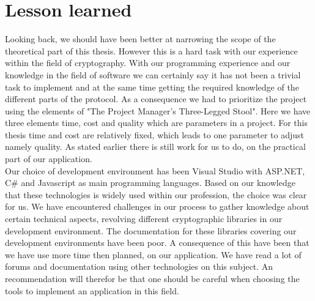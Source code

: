 \section{Lesson learned}
Looking back, we should have been better at narrowing the scope of the theoretical part of this thesis.  However this is a hard task with our  experience within the field of cryptography. With our programming experience and our knowledge in the field of software we can certainly say it has not been a trivial task to implement and at the same time getting the required knowledge of the different parts of the protocol. As a consequence we had to prioritize the project using the elements of "The Project Manager's Three-Legged Stool". Here we have three elements time, cost and quality which are parameters in a project. For this thesis time and cost are relatively fixed, which leads to one parameter to adjust namely quality. As stated earlier there is still work for us to do, on the practical part of our application. \\

\noindent
Our choice of development environment has been Visual Studio with ASP.NET, C\# and Javascript as main programming languages. Based on our knowledge that these technologies is widely used within our profession, the choice was clear for us. We have encountered challenges in our process to gather knowledge about certain technical aspects, revolving different cryptographic libraries in our development environment. The documentation for these libraries covering our development environments have been poor. A consequence of this have been that we have use more time then planned, on our application. We have read a lot of forums and documentation using other technologies on this subject. An recommendation will therefor be that one should be careful when choosing the tools to implement an application in this field. 








